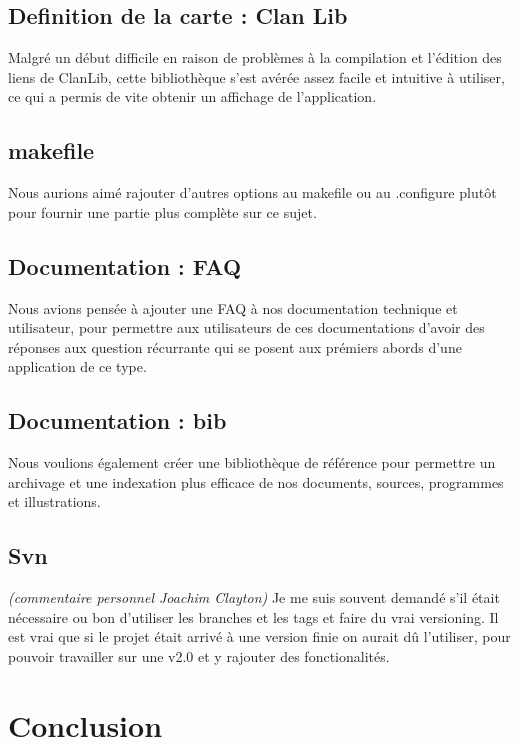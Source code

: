 \documentclass[a4paper 12pts]{article}
\begin{document}
\subsection{Definition de la carte : Clan Lib}
Malgré un début difficile en raison de problèmes à la compilation et l'édition des liens de ClanLib, cette bibliothèque s'est avérée assez facile et intuitive à utiliser, ce qui a permis de vite obtenir un affichage de l'application.

\subsection{makefile}
Nous aurions aimé rajouter d'autres options au makefile ou au .configure plutôt pour fournir une partie plus complète sur ce sujet.

\subsection{Documentation : FAQ}

Nous avions pensée à ajouter une FAQ à nos documentation technique et utilisateur, pour permettre aux utilisateurs de ces documentations d'avoir des réponses aux question récurrante qui se posent aux prémiers abords d'une application de ce type.

\subsection{Documentation : bib}

Nous voulions également créer une bibliothèque de référence pour permettre un archivage et une indexation plus efficace de nos documents, sources, programmes et illustrations.

\subsection{Svn}

\emph{(commentaire personnel Joachim Clayton)}
Je me suis souvent demandé s'il était nécessaire ou bon d'utiliser les branches et les tags et faire du vrai versioning. 
Il est vrai que si le projet était arrivé à une version finie on aurait dû l'utiliser, pour pouvoir travailler sur une v2.0 et y rajouter des fonctionalités.



\section{Conclusion}
\end{document}
